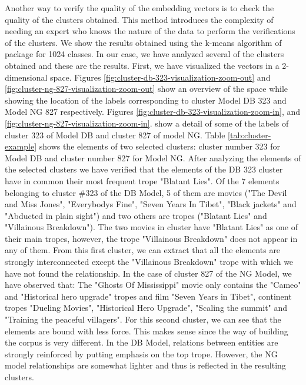 \documentclass[letterpaper]{article}
\begin{document}
    
    Another way to verify the quality of the embedding vectors is to check the quality of the clusters obtained. This method introduces the complexity of needing an expert who knows the nature of the data to perform the verifications of the clusters. We show the results obtained using the k-means algorithm of \cite{git-hub-word2vec} package for 1024 classes.   In our case, we have analyzed several of the clusters obtained and these are the results. First, we have visualized the vectors in a 2-dimensional space. Figures \ref{fig:cluster-db-323-visualization-zoom-out} and \ref{fig:cluster-ng-827-visualization-zoom-out} show an overview of the space while showing the location of the labels corresponding to cluster Model DB 323 and Model NG 827 respectively. Figures \ref{fig:cluster-db-323-visualization-zoom-in}, and \ref{fig:cluster-ng-827-visualization-zoom-in}. show a detail of some of the labels of cluster 323 of Model DB and cluster 827 of model NG. Table \ref{tab:cluster-example} shows the elements of two selected clusters: cluster number 323 for Model DB and cluster number 827 for Model NG. After analyzing the elements of the selected clusters we have verified that the elements of the DB 323 cluster have in common their most frequent trope "Blatant Lies". Of the 7 elements belonging to cluster \#323 of the DB Model, 5 of them are movies ("The Devil and Miss Jones", "Everybodys Fine", "Seven Years In Tibet", "Black jackets" and "Abducted in plain sight") and two others are tropes ("Blatant Lies" and "Villainous Breakdown"). The two movies in cluster have "Blatant Lies" as one of their main tropes, however, the trope "Villainous Breakdown" does not appear in any of them. From this first cluster, we can extract that all the elements are strongly interconnected except the "Villainous Breakdown" trope with which we have not found the relationship. In the case of cluster 827 of the NG Model, we have observed that: The "Ghosts Of Mississippi" movie only contains the "Cameo" and "Historical hero upgrade" tropes and film "Seven Years in Tibet", continent tropes "Dueling Movies", "Historical Hero Upgrade", "Scaling the summit" and "Training the peaceful villagers". For this second cluster, we can see that the elements are bound with less force. This makes sense since the way of building the corpus is very different. In the DB Model, relations between entities are strongly reinforced by putting emphasis on the top trope. However, the NG model relationships are somewhat lighter and thus is reflected in the resulting clusters.
    
\end{document}
